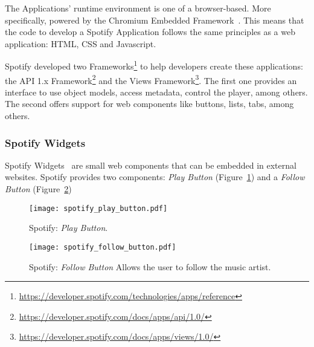         The Applications' runtime environment is one of a browser-based.
        More specifically, powered by the Chromium Embedded Framework~\cite{chromiumembedded}.
        This means that the code to develop a Spotify Application follows the same principles as a web application: HTML, CSS and Javascript.

        Spotify developed two Frameworks\footnote{\url{https://developer.spotify.com/technologies/apps/reference}} to help developers create these applications: the API 1.x Framework\footnote{\url{https://developer.spotify.com/docs/apps/api/1.0/}} and the Views Framework\footnote{\url{https://developer.spotify.com/docs/apps/views/1.0/}}.
        The first one provides an interface to use object models, access metadata, control the player, among others.
        The second offers support for web components like buttons, lists, tabs, among others.



      \subsubsection{Spotify Widgets} %
      \label{sub:spotify_widgets}

        Spotify Widgets~\cite{spwidgets} are small web components that can be embedded in external websites.
        Spotify provides two components: \emph{Play Button} (Figure~\ref{fig:spotify_play_button}) and a \emph{Follow Button} (Figure~\ref{fig:spotify_follow_button})

        \begin{figure}[H]
          \begin{center}
            \texttt{[image: spotify\_play\_button.pdf]}
          \end{center}
          \caption{Spotify: \emph{Play Button}.}
          \label{fig:spotify_play_button}
        \end{figure}

        \begin{figure}[H]
          \begin{center}
            \texttt{[image: spotify\_follow\_button.pdf]}
          \end{center}
          \caption{Spotify: \emph{Follow Button} Allows the user to follow the music artist.}
          \label{fig:spotify_follow_button}
        \end{figure}

